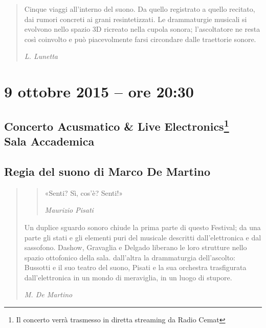 \documentclass[8pt, twoside, a5paper]{extreport}
\begin{document}
\begin{quote}

{\svolk \small
Cinque viaggi all'interno del suono.
Da quello registrato a quello recitato, dai rumori concreti ai grani resintetizzati.
Le drammaturgie musicali si evolvono nello spazio 3D ricreato nella cupola sonora; l'ascoltatore ne resta così coinvolto e può piacevolmente farsi circondare dalle traettorie sonore.}

\emph{L. Lunetta}
\end{quote} 


\begin{multicols}{2}




\end{multicols}

\clearpage

\section*{9 ottobre 2015 -- ore 20:30}

\subsection*{{\small Concerto Acusmatico \& Live Electronics\footnote{ Il concerto verrà trasmesso in diretta streaming da Radio Cemat}} \\
	\textsf{Sala Accademica}}

{\fontsize{30}{30} }

\subsection*{\textsf{Regia del suono di Marco De Martino}}

\begin{quote}

{\svolk \small
\begin{quote}«Senti? Sì, cos’è? Senti!»

\hspace{1mm}\emph{Maurizio Pisati}
\end{quote}

Un duplice sguardo sonoro chiude la prima parte di questo Festival; da una parte gli stati e gli elementi puri del musicale descritti dall'elettronica  e dal sassofono. Dashow, Gravaglia e Delgado liberano le loro strutture nello spazio ottofonico della sala. dall'altra la drammaturgia dell'ascolto: Bussotti e il suo teatro del suono, Pisati e la  sua orchestra trasfigurata dall'elettronica in un mondo di meraviglia, in un luogo di stupore.}

\emph{M. De Martino}
\end{quote}    
\end{document}

